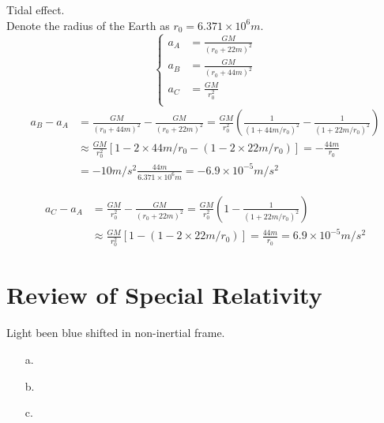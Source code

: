 \documentclass[11pt,fleqn]{book} %
\begin{document}
\begin{problem}
	Tidal effect.\\
	Denote the radius of the Earth as $r_0 = 6.371 \times 10^6 m$.
	\begin{equation}
		\begin{cases}
			a_A &= \frac{GM}{(r_0 + 22m)^2}\\
			a_B &= \frac{GM}{(r_0 + 44m)^2}\\
			a_C &= \frac{GM}{r_0^2}\\
		\end{cases}
	\end{equation}
\begin{equation}
	\begin{split}
	a_B - a_A &= \frac{GM}{(r_0 + 44m)^2} - \frac{GM}{(r_0 + 22m)^2} = \frac{GM}{r_0^2} (\frac{1}{(1 + 44m/r_0)^2} - \frac{1}{(1 + 22m/r_0)^2}) \\
	& \approx \frac{GM}{r_0^2} [1 - 2 \times 44m/r_0 - (1 - 2 \times 22m/r_0)] = - \frac{44m}{r_0}\\
	& = - 10m/s^2 \frac{44m}{6.371 \times 10^6 m} = -6.9\times 10^{-5} m/s^2
	\end{split}
\end{equation}

\begin{equation}
	\begin{split}
		a_C - a_A &= \frac{GM}{r_0^2} - \frac{GM}{(r_0 + 22m)^2} = \frac{GM}{r_0^2} (1 - \frac{1}{(1 + 22m/r_0)^2}) \\
		& \approx \frac{GM}{r_0^2} [1  - (1 - 2 \times 22m/r_0)] =  \frac{44m}{r_0} = 6.9\times 10^{-5} m/s^2
	\end{split}
\end{equation}
\end{problem}



\chapter{Review of Special Relativity}
\begin{problem}
	Light been blue shifted in non-inertial frame.\\
	\begin{enumerate}
		\item[a.]
		
		\item[b.] 
		
		\item[c.] 
	\end{enumerate}
\end{problem}
\end{document}
